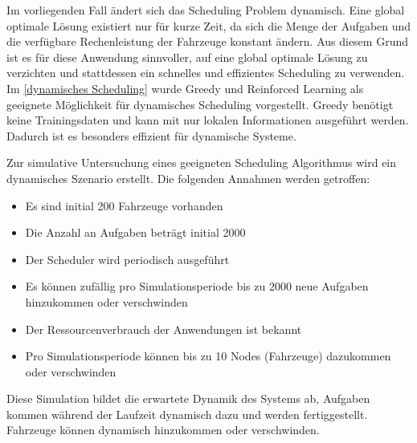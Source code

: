 Im vorliegenden Fall ändert sich das Scheduling Problem dynamisch. Eine global optimale Lösung existiert nur für kurze Zeit, da sich die Menge der Aufgaben und die verfügbare Rechenleistung der Fahrzeuge konstant ändern. Aus diesem Grund ist es für diese Anwendung sinnvoller, auf eine global optimale Lösung zu verzichten und stattdessen ein schnelles und effizientes Scheduling zu verwenden. Im \autoref{dynamisches Scheduling} wurde Greedy und Reinforced Learning als geeignete Möglichkeit für dynamisches Scheduling vorgestellt. Greedy benötigt keine Trainingsdaten und kann  mit nur lokalen Informationen ausgeführt werden. Dadurch ist es besonders effizient für dynamische Systeme.

Zur simulative Untersuchung eines geeigneten Scheduling Algorithmus wird ein dynamisches Szenario erstellt. Die folgenden Annahmen werden getroffen:

\begin{itemize}
	\item Es sind initial 200 Fahrzeuge vorhanden
	\item Die Anzahl an Aufgaben beträgt initial 2000
	\item Der Scheduler wird periodisch ausgeführt
	\item Es können zufällig pro Simulationsperiode bis zu 2000 neue Aufgaben hinzukommen oder verschwinden
	\item Der Ressourcenverbrauch der Anwendungen ist bekannt
	\item Pro Simulationsperiode können bis zu 10 Nodes (Fahrzeuge) dazukommen oder verschwinden
\end{itemize}
Diese Simulation bildet die erwartete Dynamik des Systems ab, Aufgaben kommen während der Laufzeit dynamisch dazu und werden fertiggestellt. Fahrzeuge können dynamisch hinzukommen oder verschwinden.


  

